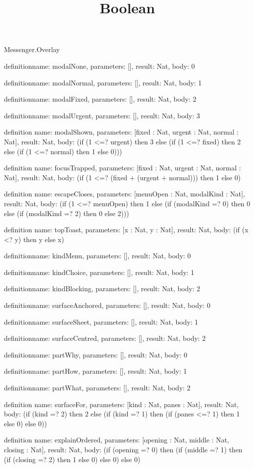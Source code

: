 \begin{lexlean}{Messenger.Overlay}
\title{Boolean}
\begin{semanticmodule}
definition{name: modalNone, parameters: [], result: Nat, body: 0}

definition{name: modalNormal, parameters: [], result: Nat, body: 1}

definition{name: modalFixed, parameters: [], result: Nat, body: 2}

definition{name: modalUrgent, parameters: [], result: Nat, body: 3}

definition{
  name: modalShown,
  parameters: [fixed : Nat, urgent : Nat, normal : Nat],
  result: Nat,
  body: (if (1 <=? urgent) then 3 else (if (1 <=? fixed) then 2 else (if (1 <=? normal) then 1 else 0)))
}

definition{
  name: focusTrapped,
  parameters: [fixed : Nat, urgent : Nat, normal : Nat],
  result: Nat,
  body: (if (1 <=? (fixed + (urgent + normal))) then 1 else 0)
}

definition{
  name: escapeCloses,
  parameters: [menuOpen : Nat, modalKind : Nat],
  result: Nat,
  body: (if (1 <=? menuOpen) then 1 else (if (modalKind =? 0) then 0 else (if (modalKind =? 2) then 0 else 2)))
}

definition{
  name: topToast,
  parameters: [x : Nat, y : Nat],
  result: Nat,
  body: (if (x <? y) then y else x)
}

definition{name: kindMenu, parameters: [], result: Nat, body: 0}

definition{name: kindChoice, parameters: [], result: Nat, body: 1}

definition{name: kindBlocking, parameters: [], result: Nat, body: 2}

definition{name: surfaceAnchored, parameters: [], result: Nat, body: 0}

definition{name: surfaceSheet, parameters: [], result: Nat, body: 1}

definition{name: surfaceCentred, parameters: [], result: Nat, body: 2}

definition{name: partWhy, parameters: [], result: Nat, body: 0}

definition{name: partHow, parameters: [], result: Nat, body: 1}

definition{name: partWhat, parameters: [], result: Nat, body: 2}

definition{
  name: surfaceFor,
  parameters: [kind : Nat, panes : Nat],
  result: Nat,
  body: (if (kind =? 2) then 2 else (if (kind =? 1) then (if (panes <=? 1) then 1 else 0) else 0))
}

definition{
  name: explainOrdered,
  parameters: [opening : Nat, middle : Nat, closing : Nat],
  result: Nat,
  body: (if (opening =? 0) then (if (middle =? 1) then (if (closing =? 2) then 1 else 0) else 0) else 0)
}
\end{semanticmodule}
\end{lexlean}
